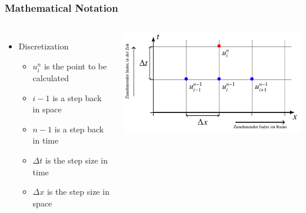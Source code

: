 %
%
%

\begin{frame}
  \frametitle{Mathematical Notation}
  \begin{columns}
    \begin{itemize}
     \item Discretization
     \begin{itemize}
       \item  $u_i^n$ is the point to be calculated
       \item $i-1$ is a step back in space
       \item $n-1$ is a step back in time
       \item $\Delta t$ is the step size in time
       \item $\Delta x$ is the step size in space

     \end{itemize}
    \end{itemize}
    \begin{center}
        \includegraphics[width=1\textwidth]{../BurgersEquation/tikz/Gitter/gitter.pdf}
      \end{center}
  \end{columns}
  \end{frame}
%
